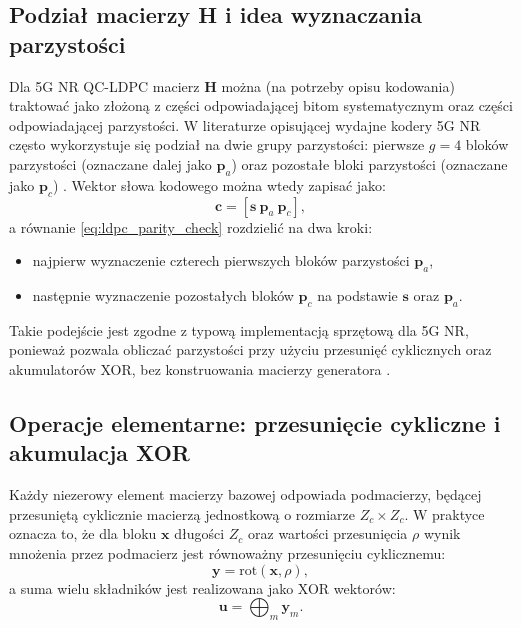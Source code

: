 \subsection{Podział macierzy \textbf{H} i idea wyznaczania parzystości}
Dla 5G NR QC-LDPC macierz \textbf{H} można (na potrzeby opisu kodowania) traktować jako złożoną z części odpowiadającej bitom
systematycznym oraz części odpowiadającej parzystości. W literaturze opisującej wydajne kodery 5G NR często wykorzystuje się
podział na dwie grupy parzystości: pierwsze $g=4$ bloków parzystości (oznaczane dalej jako $\mathbf{p}_a$) oraz pozostałe bloki
parzystości (oznaczane jako $\mathbf{p}_c$) \cite{bib:nguyen2019_qcldpc}.
Wektor słowa kodowego można wtedy zapisać jako:
\begin{equation}
\mathbf{c} = \left[\mathbf{s} \ \mathbf{p}_a \ \mathbf{p}_c\right],
\label{eq:codeword_split}
\end{equation}
a równanie \eqref{eq:ldpc_parity_check} rozdzielić na dwa kroki:
\begin{itemize}
  \item najpierw wyznaczenie czterech pierwszych bloków parzystości $\mathbf{p}_a$,
  \item następnie wyznaczenie pozostałych bloków $\mathbf{p}_c$ na podstawie $\mathbf{s}$ oraz $\mathbf{p}_a$.
\end{itemize}
Takie podejście jest zgodne z typową implementacją sprzętową dla 5G NR, ponieważ pozwala obliczać parzystości
przy użyciu przesunięć cyklicznych oraz akumulatorów XOR, bez konstruowania macierzy generatora \cite{bib:nguyen2019_qcldpc}.

\subsection{Operacje elementarne: przesunięcie cykliczne i akumulacja XOR}
Każdy niezerowy element macierzy bazowej odpowiada podmacierzy, będącej przesuniętą cyklicznie macierzą jednostkową
o rozmiarze $Z_c \times Z_c$. W praktyce oznacza to, że dla bloku $\mathbf{x}$ długości $Z_c$ oraz wartości przesunięcia $\rho$
wynik mnożenia przez podmacierz jest równoważny przesunięciu cyklicznemu:
\begin{equation}
\mathbf{y} = \mathrm{rot}(\mathbf{x},\rho),
\label{eq:rot}
\end{equation}
a suma wielu składników jest realizowana jako XOR wektorów:
\begin{equation}
\mathbf{u} = \bigoplus_{m} \mathbf{y}_m.
\label{eq:xor_sum}
\end{equation}

